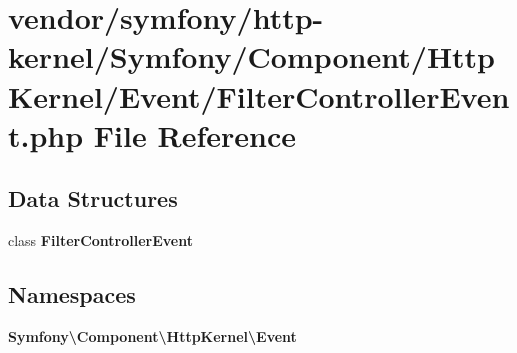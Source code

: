\section{vendor/symfony/http-\/kernel/\+Symfony/\+Component/\+Http\+Kernel/\+Event/\+Filter\+Controller\+Event.php File Reference}
\label{_filter_controller_event_8php}
\subsection*{Data Structures}
\begin{DoxyCompactItemize}
\item 
class {\bf Filter\+Controller\+Event}
\end{DoxyCompactItemize}
\subsection*{Namespaces}
\begin{DoxyCompactItemize}
\item 
 {\bf Symfony\textbackslash{}\+Component\textbackslash{}\+Http\+Kernel\textbackslash{}\+Event}
\end{DoxyCompactItemize}
